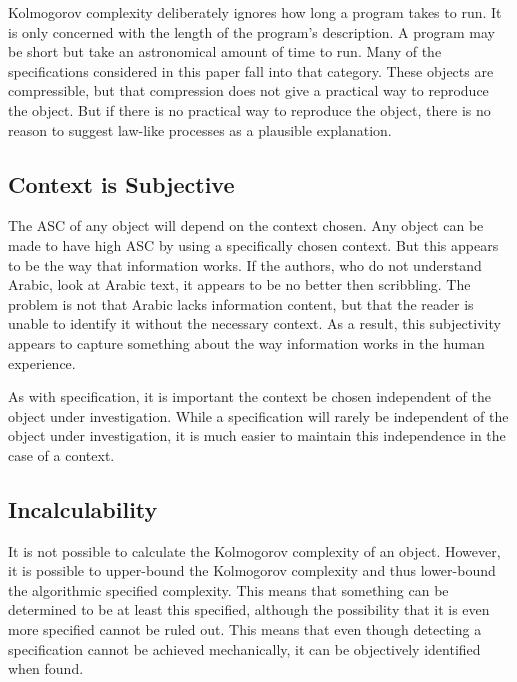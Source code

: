 Kolmogorov complexity deliberately ignores how long a program takes to run.
It is only concerned with the length of the program's description.
A program may be short but take an astronomical amount of time to run.
Many of the specifications considered in this paper fall into that category.
These objects are compressible, but that compression does not give a practical way to reproduce the object.
But if there is no practical way to reproduce the object, there is no reason to suggest law-like processes as a plausible explanation.

\subsection{Context is Subjective}
The ASC of any object will depend on the context chosen.
Any object can be made to have high ASC by using a specifically chosen context.
But this appears to be the way that information works.
If the authors, who do not understand Arabic, look at Arabic text, it appears to be no better then scribbling.
The problem is not that Arabic lacks information content, but that the reader is unable to identify it without the necessary context.
As a result, this subjectivity appears to capture something about the way information works in the human experience.

As with specification, it is important the context be chosen independent of the object under investigation.
While a specification will rarely be independent of the object under investigation, it is much easier to maintain this independence in the case of a context.

\subsection{Incalculability}
It is not possible to calculate the Kolmogorov complexity of an object.
However, it is possible to upper-bound the Kolmogorov complexity and thus lower-bound the algorithmic specified complexity.
This means that something can be determined to be at least this specified, although the possibility that it is even more specified cannot be ruled out.
This means that even though detecting a specification cannot be achieved mechanically, it can be objectively identified when found.


